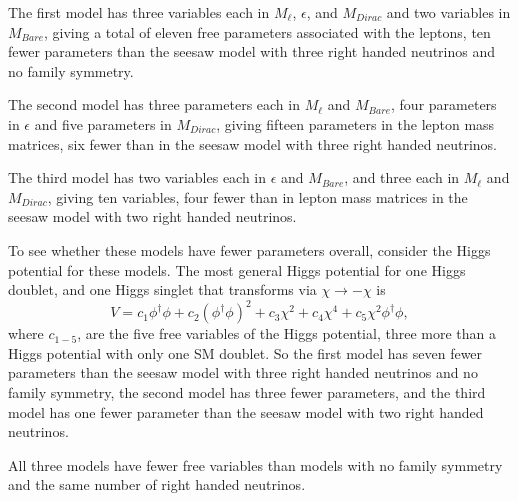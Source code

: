 \documentclass[nofootinbib,showpacs]{revtex4}
\begin{document}
The first model has three variables each in $M_\ell$, $\epsilon$, and $M_{Dirac}$ and two variables in $M_{Bare}$, giving a total of eleven free parameters associated with the leptons, ten fewer parameters than the seesaw model with three right handed neutrinos and no family symmetry.

The second model has three parameters each in $M_\ell$ and $M_{Bare}$, four parameters in $\epsilon$ and five parameters in $M_{Dirac}$, giving fifteen parameters in the lepton mass matrices, six fewer than in the seesaw model with three right handed neutrinos.

The third model has two variables each in $\epsilon$ and $M_{Bare}$, and three each in $M_\ell$ and $M_{Dirac}$, giving ten variables, four fewer than in lepton mass matrices in the seesaw model with two right handed neutrinos. 



To see whether these models have fewer parameters overall, consider the Higgs potential for these models.
The most general Higgs potential for one Higgs doublet, and one Higgs singlet that transforms via $\chi\rightarrow -\chi$ is  
\begin{equation}\label{higgspot}
V= c_1 \phi^\dagger \phi + c_2 (\phi^\dagger \phi)^2 + c_3 \chi^2 + c_4 \chi^4 + c_5 \chi^2  \phi^\dagger \phi,  
\end{equation}
where $c_{1-5}$, are the five free variables of the Higgs potential, three more than a Higgs potential with only one SM doublet. So the first model has seven fewer parameters than the seesaw model with three right handed neutrinos and no family symmetry, the second model has three fewer parameters, and the third model has one fewer parameter than the seesaw model with two right handed neutrinos.


All three models have fewer free variables than models with no family symmetry and the same number of right handed neutrinos.
\end{document}
